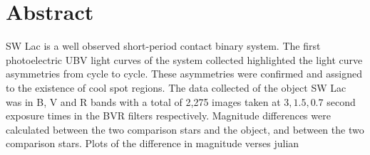 \section{Abstract}
\label{sec:abstract}

SW Lac is a well observed short-period contact binary system. The first photoelectric 
UBV light curves of the system collected highlighted the light curve asymmetries from 
cycle to cycle. These asymmetries were confirmed and assigned to the existence of cool 
spot regions. The data collected of the object SW Lac was in B, V and R bands with a total 
of 2,275 images taken at $3, 1.5, 0.7$ second exposure times in the BVR filters respectively.
 Magnitude differences were calculated between the two comparison stars and the object, 
 and between the two comparison stars. Plots of the difference in magnitude verses julian 